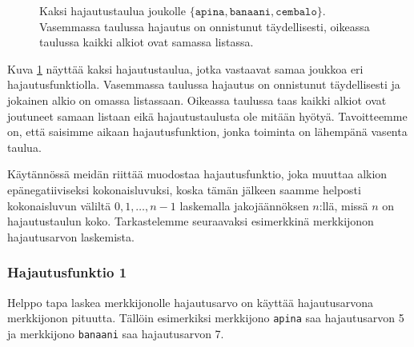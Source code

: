 \begin{figure}
\caption{Kaksi hajautustaulua joukolle $\{\texttt{apina},\texttt{banaani},\texttt{cembalo}\}$.
Vasemmassa taulussa hajautus on onnistunut täydellisesti,
oikeassa taulussa kaikki alkiot ovat samassa listassa.}
\label{fig:hajjak}
\end{figure}

Kuva \ref{fig:hajjak} näyttää kaksi hajautustaulua, jotka vastaavat
samaa joukkoa eri hajautusfunktiolla.
Vasemmassa taulussa hajautus on onnistunut täydellisesti
ja jokainen alkio on omassa listassaan.
Oikeassa taulussa taas kaikki alkiot ovat joutuneet samaan
listaan eikä hajautustaulusta ole mitään hyötyä.
Tavoitteemme on, että saisimme aikaan hajautusfunktion,
jonka toiminta on lähempänä vasenta taulua.

Käytännössä meidän riittää muodostaa hajautusfunktio,
joka muuttaa alkion epänegatiiviseksi kokonaisluvuksi,
koska tämän jälkeen saamme helposti kokonaisluvun
väliltä $0,1,\ldots,n-1$ laskemalla jakojäännöksen $n$:llä,
missä $n$ on hajautustaulun koko.
Tarkastelemme seuraavaksi esimerkkinä merkkijonon
hajautusarvon laskemista.

\subsubsection{Hajautusfunktio 1}

Helppo tapa laskea merkkijonolle hajautusarvo on
käyttää hajautusarvona merkkijonon pituutta.
Tällöin esimerkiksi merkkijono \texttt{apina} saa
hajautusarvon 5 ja merkkijono \texttt{banaani} saa
hajautusarvon 7.

